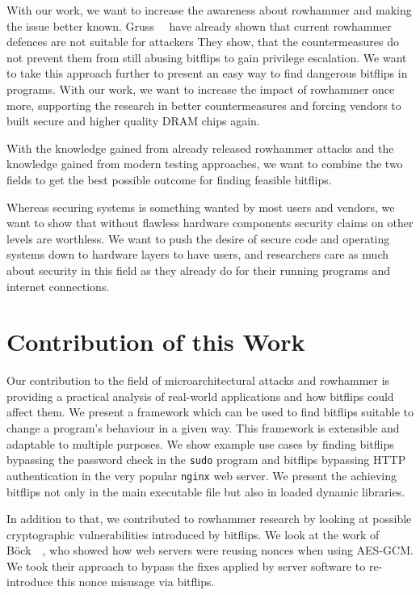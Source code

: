 With our work, we want to increase the awareness about rowhammer and making the
issue better known. Gruss~\etal~\cite{flipinthewall} have already shown that
current rowhammer defences are not suitable for attackers They show, that the
countermeasures do not prevent them from still abusing bitflips to gain
privilege escalation. We want to take this approach further to present an easy
way to find dangerous bitflips in programs. With our work, we want to increase
the impact of rowhammer once more, supporting the research in better
countermeasures and forcing vendors to built secure and higher quality DRAM
chips again.

With the knowledge gained from already released rowhammer attacks and the
knowledge gained from modern testing approaches, we want to combine the two
fields to get the best possible outcome for finding feasible bitflips.

Whereas securing systems is something wanted by most users and vendors, we want
to show that without flawless hardware components security claims on other
levels are worthless. We want to push the desire of secure code and operating
systems down to hardware layers to have users, and researchers care as much
about security in this field as they already do for their running programs and
internet connections.

\section{Contribution of this Work}

Our contribution to the field of microarchitectural attacks and rowhammer is
providing a practical analysis of real-world applications and how bitflips could
affect them. We present a framework which can be used to find bitflips suitable
to change a program's behaviour in a given way. This framework is extensible and
adaptable to multiple purposes. We show example use cases by finding bitflips
bypassing the password check in the \texttt{sudo} program and bitflips bypassing
HTTP authentication in the very popular \texttt{nginx} web server. We present
the achieving bitflips not only in the main executable file but also in loaded
dynamic libraries.

In addition to that, we contributed to rowhammer research by looking at possible
cryptographic vulnerabilities introduced by bitflips. We look at the work of
Böck~\etal~\cite{gcmnonceattack}, who showed how web servers were reusing nonces
when using AES-GCM. We took their approach to bypass the fixes applied by server
software to re-introduce this nonce misusage via bitflips.

